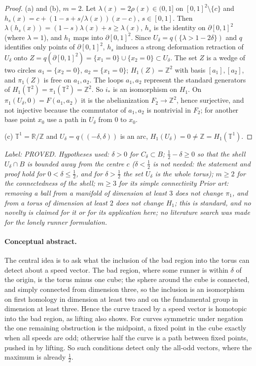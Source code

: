 \documentclass[11pt]{article}
\theoremstyle{remark}
\newcommand{\Z}{\mathbb{Z}}
\newcommand{\R}{\mathbb{R}}
\newcommand{\lab}[1]{\par\smallskip\noindent\textit{Label: #1.}}
\begin{document}
\begin{proof}
(a) and (b), $m=2$. Let $\lambda(x)=2\rho(x)\in(0,1]$ on $[0,1]^2\setminus\{c\}$ and $h_s(x)=c+(1-s+s/\lambda(x))(x-c)$, $s\in[0,1]$. Then $\lambda(h_s(x))=(1-s)\lambda(x)+s\ge\lambda(x)$, $h_s$ is the identity on $\partial[0,1]^2$ (where $\lambda=1$), and $h_1$ maps into $\partial[0,1]^2$. Since $U_\delta=q(\{\lambda>1-2\delta\})$ and $q$ identifies only points of $\partial[0,1]^2$, $h_s$ induces a strong deformation retraction of $U_\delta$ onto $Z=q(\partial[0,1]^2)=\{x_1=0\}\cup\{x_2=0\}\subset U_\delta$. The set $Z$ is a wedge of two circles $a_1=\{x_2=0\}$, $a_2=\{x_1=0\}$; $H_1(Z)=\Z^2$ with basis $[a_1],[a_2]$, and $\pi_1(Z)$ is free on $a_1,a_2$. The loops $a_1,a_2$ represent the standard generators of $H_1(\mathbb T^2)=\pi_1(\mathbb T^2)=\Z^2$. So $i_*$ is an isomorphism on $H_1$. On $\pi_1(U_\delta,0)=F(a_1,a_2)$ it is the abelianization $F_2\to\Z^2$, hence surjective, and not injective because the commutator of $a_1,a_2$ is nontrivial in $F_2$; for another base point $x_0$ use a path in $U_\delta$ from $0$ to $x_0$.

(c) $\mathbb T^1=\R/\Z$ and $U_\delta=q((-\delta,\delta))$ is an arc, $H_1(U_\delta)=0\ne\Z=H_1(\mathbb T^1)$.
\end{proof}
\lab{PROVED. Hypotheses used: $\delta>0$ for $C_\delta\subset B$; $\frac12-\delta\ge0$ so that the shell $U_\delta\cap B$ is bounded away from the centre $c$ ($\delta<\frac12$ is not needed: the statement and proof hold for $0<\delta\le\frac12$, and for $\delta>\frac12$ the set $U_\delta$ is the whole torus); $m\ge2$ for the connectedness of the shell; $m\ge3$ for its simple connectivity Prior art: removing a ball from a manifold of dimension at least $3$ does not change $\pi_1$, and from a torus of dimension at least $2$ does not change $H_1$; this is standard, and no novelty is claimed for it or for its application here; no literature search was made for the lonely runner formulation}

\paragraph{Conceptual abstract.} The central idea is to ask what the inclusion of the bad region into the torus can detect about a speed vector. The bad region, where some runner is within $\delta$ of the origin, is the torus minus one cube; the sphere around the cube is connected, and simply connected from dimension three, so the inclusion is an isomorphism on first homology in dimension at least two and on the fundamental group in dimension at least three. Hence the curve traced by a speed vector is homotopic into the bad region, as lifting also shows. For curves symmetric under negation the one remaining obstruction is the midpoint, a fixed point in the cube exactly when all speeds are odd; otherwise half the curve is a path between fixed points, pushed in by lifting. So such conditions detect only the all-odd vectors, where the maximum is already $\frac12$.
\end{document}
